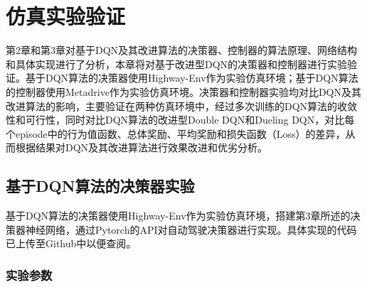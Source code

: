 %
%
%
%
%

\chapter{仿真实验验证}

第2章和第3章对基于DQN及其改进算法的决策器、控制器的算法原理、网络结构和具体实现进行了分析，本章将对基于改进型DQN的决策器和控制器进行实验验证。基于DQN算法的决策器使用Highway-Env作为实验仿真环境；基于DQN算法的控制器使用Metadrive作为实验仿真环境。决策器和控制器实验均对比DQN及其改进算法的影响，主要验证在两种仿真环境中，经过多次训练的DQN算法的收敛性和可行性，同时对比DQN算法的改进型Double DQN和Dueling DQN，对比每个episode中的行为值函数、总体奖励、平均奖励和损失函数（Loss）的差异，从而根据结果对DQN及其改进算法进行效果改进和优劣分析。

\section{基于DQN算法的决策器实验}\label{4.1基于DQN算法的决策器实验}

基于DQN算法的决策器使用Highway-Env作为实验仿真环境，搭建第3章所述的决策器神经网络，通过Pytorch的API对自动驾驶决策器进行实现。具体实现的代码已上传至Github中以便查阅\cite{highway-env-dqn}。

\subsection{实验参数}

\begin{table}[htbp]
    \caption{决策器网络参数}\label{决策器网络参数}
    \centering
    \renewcommand\arraystretch{1.5}
\end{table}

